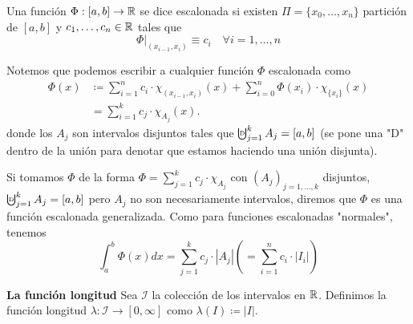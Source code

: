 \begin{definition}
	Una función $\Phi : [a,b] \to \mathbb{R}$ se dice escalonada si existen $\Pi = \{ x_0,\dots,x_n \}$ partición de $[a,b]$ y $c_1,\dots,c_n \in \mathbb{R}$ tales que
	\[
	\Phi |_{(x_{i-1},x_i)} \equiv c_i \quad \forall i = 1,\dots,n
	\]
\end{definition}
\bigskip
Notemos que podemos escribir a cualquier función $\Phi$ escalonada como
\begin{align*}
	\Phi (x) & \coloneq \sum_{i=1}^{n} c_i \cdot \chi_{(x_{i-1},x_i)}(x) + \sum_{i=0}^{n} \Phi(x_i) \cdot \chi_{\{x_i\}}(x) \\
	& = \sum_{i=1}^{k} c_j \cdot \chi_{A_j}(x)
.\end{align*}
\noindent donde los $A_j$ son intervalos disjuntos tales que $\textbigcupd_{j=1}^{k} A_j = [a,b]$ (se pone una "D" dentro de la unión para denotar que estamos haciendo una unión disjunta). \par
\medskip
Si tomamos $\Phi$ de la forma $\Phi = \sum_{j=1}^{k} c_j \cdot \chi_{A_j}$ con $(A_j)_{j=1,\dots,k}$ disjuntos, $\textbigcupd_{j=1}^{k} A_j = [a,b]$ pero $A_j$  no son necesariamente intervalos, diremos que $\Phi$ es una función escalonada generalizada. Como para funciones escalonadas "normales", tenemos
\[
\int_{a}^{b} \Phi (x) dx = \sum_{j=1}^{k} c_j \cdot |A_j| \left( = \sum_{i=1}^{n} c_i \cdot |I_i| \right)
\]

\noindent \textbf{La función longitud}
Sea $\mathcal{I}$ la colección de los intervalos en $\mathbb{R}$. Definimos la función longitud $\lambda : \mathcal{I} \to [0,\infty]$ como $\lambda (I) \coloneq |I|$.

